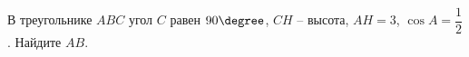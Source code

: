 \begin{ex}
	\begin{condition}
		В треугольнике \( ABC \) угол \( C \) равен \( 90\degree \), \( CH  \) – высота, \(AH=3\),  \( \cos A = \dfrac{1}{2}\). Найдите \( AB \).
	\end{condition}
\end{ex}